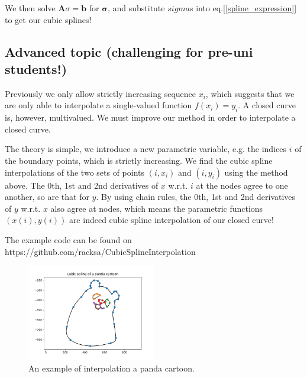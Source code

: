 \documentclass[paper=a4,fontsize=11pt]{scrartcl} %
\begin{document}
We then solve $\mathbf{A}{\sigma}= \mathbf{b}$ for $\mathbf{\sigma}$, and substitute $sigma$s into eq.[\ref{spline_expression}] to get our cubic splines! 

\subsection*{Advanced topic (challenging for pre-uni students!)}
Previously we only allow strictly increasing sequence $x_i$, which suggests that we are only able to interpolate a single-valued function $f(x_i)=y_i$. A closed curve is, however, multivalued. We must improve our method in order to interpolate a closed curve.

The theory is simple, we introduce a new parametric variable, e.g. the indices $i$ of the boundary points, which is strictly increasing. We find the cubic spline interpolations of the two sets of points $(i, x_i)$ and $(i, y_i)$ using the method above. The 0th, 1st and 2nd derivatives of $x$ w.r.t. $i$ at the nodes agree to one another, so are that for $y$. By using chain rules, the 0th, 1st and 2nd derivatives of $y$ w.r.t. $x$ also agree at nodes, which means the parametric functions $(x(i),y(i))$ are indeed cubic spline interpolation of our closed curve!

The example code can be found on https://github.com/racksa/CubicSplineInterpolation

\begin{figure}[h!]
  \centering
  \includegraphics[width=0.5\textwidth]{interpolating_a_panda.png}
  \caption{An example of interpolation a panda cartoon.}
  \label{fig:random_interpolation}
\end{figure}


\end{document}
